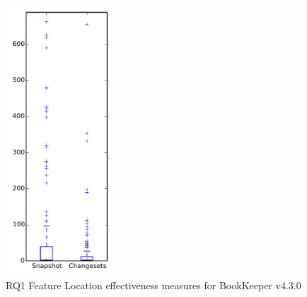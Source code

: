 
\begin{figure}[t]
\centering
\includegraphics[width=0.36\textwidth]{figures/flt/rq1_bookkeeper}
\caption{RQ1 Feature Location effectiveness measures for BookKeeper v4.3.0}
\label{fig:flt:rq1:bookkeeper}
\end{figure}
